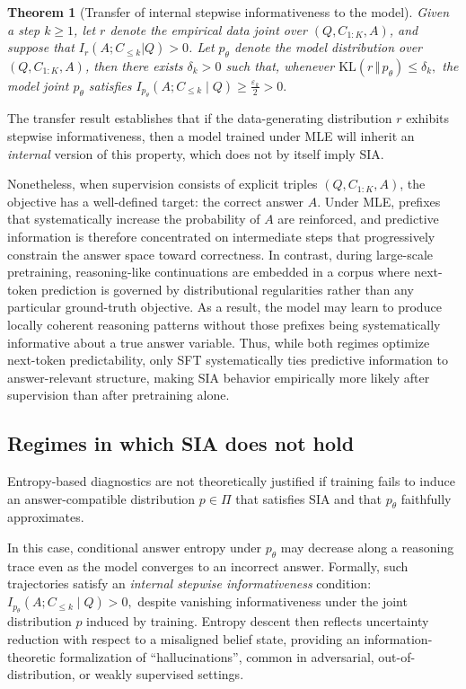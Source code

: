 \documentclass{article}
\newtheorem{theorem}{Theorem}
\begin{document}
\begin{theorem}[Transfer of internal stepwise informativeness to the model]
\label{thm:transfer-sia}
Given a step $k \geq 1$, let $r$ denote the empirical data joint over $(Q,C_{1:K},A)$, and suppose that $I_r(A;C_{\leq k} | Q)>0$. Let $p_\theta$ denote the model distribution over $(Q,C_{1:K},A)$, then there exists $\delta_k > 0$ such that, whenever
\(
\mathrm{KL}(r \,\Vert\, p_\theta) \le \delta_k,
\)
the model joint $p_\theta$ satisfies
\(
I_{p_\theta}(A; C_{\leq k} \mid Q) \ge \frac{\varepsilon_k}{2} > 0.
\)
\end{theorem}

The transfer result establishes that if the data-generating distribution $r$ exhibits stepwise informativeness, then a model trained under MLE will inherit an \emph{internal} version of this property, which does not by itself imply SIA.

Nonetheless, when supervision consists of explicit triples $(Q,C_{1:K},A)$, the objective has a well-defined target: the correct answer $A$. Under MLE, prefixes that systematically increase the probability of $A$ are reinforced, and predictive information is therefore concentrated on intermediate steps that progressively constrain the answer space toward correctness. In contrast, during large-scale pretraining, reasoning-like continuations are embedded in a corpus where next-token prediction is governed by distributional regularities rather than any particular ground-truth objective. As a result, the model may learn to produce locally coherent reasoning patterns without those prefixes being systematically informative about a true answer variable. Thus, while both regimes optimize next-token predictability, only SFT systematically ties predictive information to answer-relevant structure, making SIA behavior empirically more likely after supervision than after pretraining alone. 

\subsection{Regimes in which SIA does not hold}
\label{subsec:sia_not_hold}

Entropy-based diagnostics are not theoretically justified if training fails to induce an answer-compatible distribution $p \in \Pi$ that satisfies SIA and that $p_\theta$ faithfully approximates.

In this case, conditional answer entropy under $p_\theta$ may decrease along a reasoning trace even as the model converges to an incorrect answer. Formally, such trajectories satisfy an \emph{internal stepwise informativeness} condition:
\(
I_{p_\theta}(A ; C_{\leq k} \mid Q) > 0,
\)
despite vanishing informativeness under the joint distribution $p$ induced by training. Entropy descent then reflects uncertainty reduction with respect to a misaligned belief state, providing an information-theoretic formalization of ``hallucinations'', common in adversarial, out-of-distribution, or weakly supervised settings. 
\end{document}
